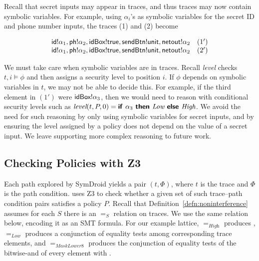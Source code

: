 Recall that secret inputs may appear in traces, and thus traces may
now contain symbolic variables. For example, using $\alpha_i$'s as
symbolic variables for the secret ID and phone number inputs, the
traces (1) and (2) become

\begin{displaymath}
  \begin{array}{cl}
    \textsf{id}!\alpha_1, \textsf{ph}!\alpha_2, \textsf{idBox}!\textsf{true},
    \textsf{sendBtn}!\textsf{unit}, \textsf{netout}!\alpha_2 & (1') \\
    \textsf{id}!\alpha_1, \textsf{ph}!\alpha_2, \textsf{idBox}!\textsf{true},
    \textsf{sendBtn}!\textsf{unit}, \textsf{netout}!\alpha_2 & (2') \\
  \end{array}
\end{displaymath}

We must take care when symbolic variables are in traces.
Recall \textit{level} checks $t,i \models \phi$ and
then assigns a security level to position $i$. If $\phi$
depends on symbolic variables in $t$, we may not be able to
decide this. For example, if the third element in $(1')$ were
$\textsf{idBox}!\alpha_3$, then we would need to reason with
conditional security levels such as
$\textit{level}(t, P, 0) =\textsf{\textbf{if }} \alpha_3 \textsf{\textbf{ then }} \textit{Low}
\textsf{\textbf{ else }} \textit{High}$. We
avoid the need for such reasoning by only using symbolic variables for
secret inputs, and by ensuring the level assigned by a policy does not
depend on the value of a secret input. We leave supporting more complex
reasoning to future work.

\subsection{Checking Policies with Z3}

Each path explored by SymDroid yields a pair $(t, \Phi)$, where $t$ is
the trace and $\Phi$ is the path condition. \toolname{} uses Z3 to check whether a given set
of such trace--path condition pairs satisfies a policy $P$. Recall that
Definition~\ref{defn:noninterference} assumes for each $S$ there is an
$=_S$ relation on traces. We use the same relation below, encoding it
as an SMT formula. For our example lattice, $=_\textit{High}$ produces
, $=_\textit{Low}$ produces a conjunction of equality tests
among corresponding trace elements, and $=_\textit{MaskLower8}$
produces the conjunction of equality tests of the bitwise-and of every
element with .

